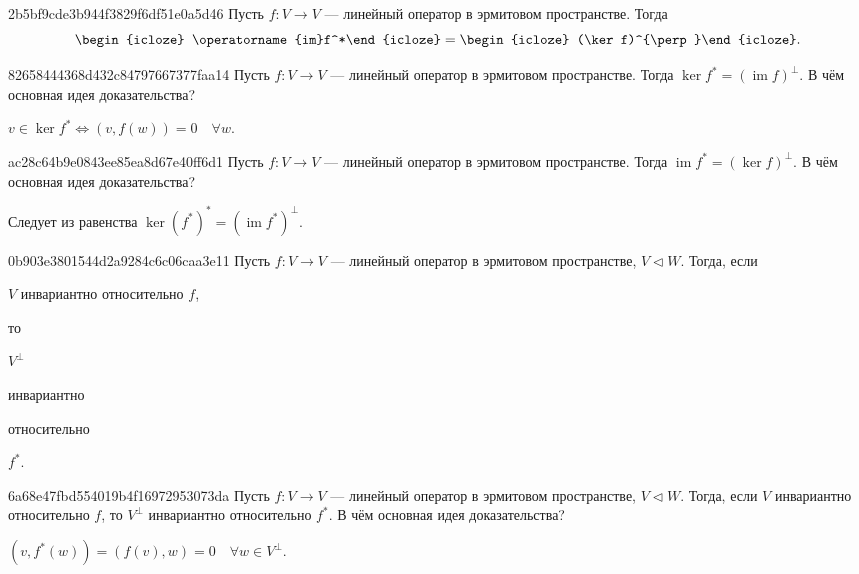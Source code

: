 \begin{note}{2b5bf9cde3b944f3829f6df51e0a5d46}
    Пусть \({ f : V \to V }\) --- линейный оператор в эрмитовом пространстве.
    Тогда
    \[
        \begin{icloze}{2}\operatorname{im}f^*\end{icloze} = \begin{icloze}{1}(\ker f)^{\perp}\end{icloze}.
    \]
\end{note}

\begin{note}{82658444368d432c84797667377faa14}
    Пусть \({ f : V \to V }\) --- линейный оператор в эрмитовом пространстве.
    Тогда \({ \ker f^* = (\operatorname{im}f)^{\perp} }\).
    В чём основная идея доказательства?

    \begin{cloze}{1}
        \({ v \in \ker f^* \iff (v, f(w)) = 0 \quad \forall w }\).
    \end{cloze}
\end{note}

\begin{note}{ac28c64b9e0843ee85ea8d67e40ff6d1}
    Пусть \({ f : V \to V }\) --- линейный оператор в эрмитовом пространстве.
    Тогда \(\operatorname{im}f^* = (\ker f)^{\perp}\).
    В чём основная идея доказательства?

    \begin{cloze}{1}
        Следует из равенства \({ \ker (f^*)^* = (\operatorname{im} f^*)^{\perp} }\).
    \end{cloze}
\end{note}

\begin{note}{0b903e3801544d2a9284c6c06caa3e11}
    Пусть \({ f : V \to V }\) --- линейный оператор в эрмитовом пространстве, \({ V \triangleleft W }\).
    Тогда, если \begin{icloze}{4}\({ V }\) инвариантно относительно \({ f }\),\end{icloze} то \begin{icloze}{1}\({ V^{\perp} }\)\end{icloze} \begin{icloze}{3}инвариантно\end{icloze} относительно \begin{icloze}{2}\({ f^* }\).\end{icloze}
\end{note}

\begin{note}{6a68e47fbd554019b4f16972953073da}
    Пусть \({ f : V \to V }\) --- линейный оператор в эрмитовом пространстве, \({ V \triangleleft W }\).
    Тогда, если \({ V }\) инвариантно относительно \({ f }\), то \({ V^{\perp} }\) инвариантно относительно \({ f^* }\).
    В чём основная идея доказательства?

    \begin{cloze}{1}
        \({ (v, f^*(w)) = (f(v), w) = 0 \quad \forall w \in V^{\perp} }\).
    \end{cloze}
\end{note}

